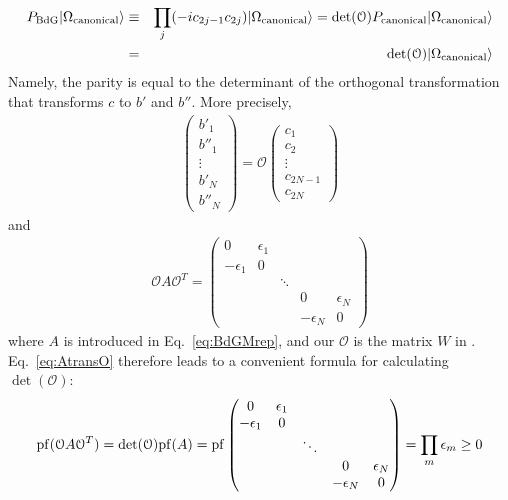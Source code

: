 \begin{eqnarray}
	P_{\rm BdG} |\Omega_{\rm canonical}\rangle &\equiv& \prod_{j} (-ic_{2j-1}c_{2j})  |\Omega_{\rm canonical}\rangle = \det(\mathcal{O}) 	P_{\rm canonical} |\Omega_{\rm canonical}\rangle \\\nonumber
	&=& \det(\mathcal{O}) |\Omega_{\rm canonical}\rangle
\end{eqnarray}
Namely, the parity is equal to the determinant of the orthogonal transformation that transforms $c$ to $b'$ and $b''$. More precisely,
\begin{eqnarray}
	\begin{pmatrix}
		b'_1 \\
		b''_1 \\
		\vdots \\
		b'_N \\
		b''_N
	\end{pmatrix} = \mathcal{O} \begin{pmatrix}
	c_1 \\
	c_2 \\
	\vdots \\
	c_{2N-1} \\
	c_{2N}
\end{pmatrix}
\end{eqnarray}
and
\begin{eqnarray}\label{eq:AtransO}
	\mathcal{O} A \mathcal{O}^T = \begin{pmatrix}
		0 & \epsilon_1 & & & \\
		-\epsilon_1 & 0 & & & \\
		& & \ddots & & \\
		& & & 0 & \epsilon_N \\
		& & & -\epsilon_N & 0
	\end{pmatrix}
\end{eqnarray}
where $A$ is introduced in Eq.~\ref{eq:BdGMrep}, and our $\mathcal{O}$ is the matrix $W$ in \cite{kitaevUnpairedMajoranaFermions2001}. Eq.~\ref{eq:AtransO} therefore leads to a convenient formula for calculating $\det(\mathcal{O})$:
\begin{eqnarray}
	{\rm pf}(	\mathcal{O} A \mathcal{O}^T) = 	\det(\mathcal{O}){\rm pf}(A) = {\rm pf}\begin{pmatrix}
		0 & \epsilon_1 & & & \\
		-\epsilon_1 & 0 & & & \\
		& & \ddots & & \\
		& & & 0 & \epsilon_N \\
		& & & -\epsilon_N & 0
	\end{pmatrix} = \prod_m \epsilon_m \geq 0
\end{eqnarray}
